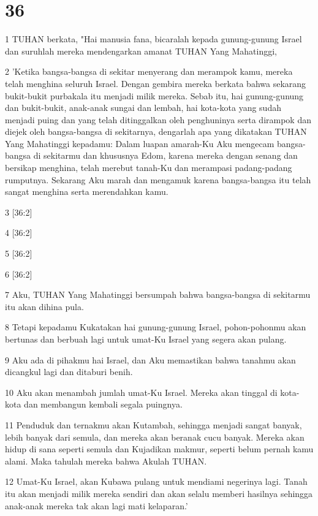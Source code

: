 \chapter{36}

\par 1 TUHAN berkata, "Hai manusia fana, bicaralah kepada gunung-gunung Israel dan suruhlah mereka mendengarkan amanat TUHAN Yang Mahatinggi,
\par 2 'Ketika bangsa-bangsa di sekitar menyerang dan merampok kamu, mereka telah menghina seluruh Israel. Dengan gembira mereka berkata bahwa sekarang bukit-bukit purbakala itu menjadi milik mereka. Sebab itu, hai gunung-gunung dan bukit-bukit, anak-anak sungai dan lembah, hai kota-kota yang sudah menjadi puing dan yang telah ditinggalkan oleh penghuninya serta dirampok dan diejek oleh bangsa-bangsa di sekitarnya, dengarlah apa yang dikatakan TUHAN Yang Mahatinggi kepadamu: Dalam luapan amarah-Ku Aku mengecam bangsa-bangsa di sekitarmu dan khususnya Edom, karena mereka dengan senang dan bersikap menghina, telah merebut tanah-Ku dan merampasi padang-padang rumputnya. Sekarang Aku marah dan mengamuk karena bangsa-bangsa itu telah sangat menghina serta merendahkan kamu.
\par 3 [36:2]
\par 4 [36:2]
\par 5 [36:2]
\par 6 [36:2]
\par 7 Aku, TUHAN Yang Mahatinggi bersumpah bahwa bangsa-bangsa di sekitarmu itu akan dihina pula.
\par 8 Tetapi kepadamu Kukatakan hai gunung-gunung Israel, pohon-pohonmu akan bertunas dan berbuah lagi untuk umat-Ku Israel yang segera akan pulang.
\par 9 Aku ada di pihakmu hai Israel, dan Aku memastikan bahwa tanahmu akan dicangkul lagi dan ditaburi benih.
\par 10 Aku akan menambah jumlah umat-Ku Israel. Mereka akan tinggal di kota-kota dan membangun kembali segala puingnya.
\par 11 Penduduk dan ternakmu akan Kutambah, sehingga menjadi sangat banyak, lebih banyak dari semula, dan mereka akan beranak cucu banyak. Mereka akan hidup di sana seperti semula dan Kujadikan makmur, seperti belum pernah kamu alami. Maka tahulah mereka bahwa Akulah TUHAN.
\par 12 Umat-Ku Israel, akan Kubawa pulang untuk mendiami negerinya lagi. Tanah itu akan menjadi milik mereka sendiri dan akan selalu memberi hasilnya sehingga anak-anak mereka tak akan lagi mati kelaparan.'
